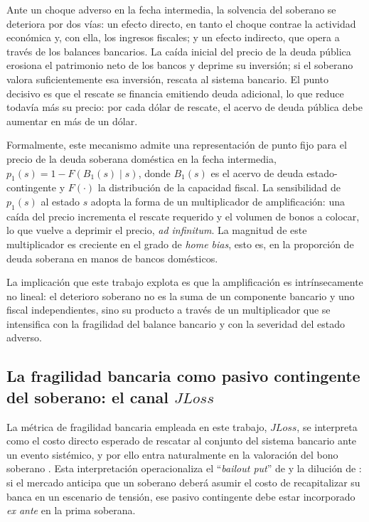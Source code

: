 Ante un choque adverso en la fecha intermedia, la solvencia del soberano se deteriora por dos vías: un efecto directo, en tanto el choque contrae la actividad económica y, con ella, los ingresos fiscales; y un efecto indirecto, que opera a través de los balances bancarios. La caída inicial del precio de la deuda pública erosiona el patrimonio neto de los bancos y deprime su inversión; si el soberano valora suficientemente esa inversión, rescata al sistema bancario. El punto decisivo es que el rescate se financia emitiendo deuda adicional, lo que reduce todavía más su precio: por cada dólar de rescate, el acervo de deuda pública debe aumentar en más de un dólar.

Formalmente, este mecanismo admite una representación de punto fijo para el precio de la deuda soberana doméstica en la fecha intermedia, $p_1(s) = 1 - F\!\left(B_1(s)\mid s\right)$, donde $B_1(s)$ es el acervo de deuda estado-contingente y $F(\cdot)$ la distribución de la capacidad fiscal. La sensibilidad de $p_1(s)$ al estado $s$ adopta la forma de un multiplicador de amplificación: una caída del precio incrementa el rescate requerido y el volumen de bonos a colocar, lo que vuelve a deprimir el precio, \textit{ad infinitum}. La magnitud de este multiplicador es creciente en el grado de \textit{home bias}, esto es, en la proporción de deuda soberana en manos de bancos domésticos.

La implicación que este trabajo explota es que la amplificación es intrínsecamente no lineal: el deterioro soberano no es la suma de un componente bancario y uno fiscal independientes, sino su producto a través de un multiplicador que se intensifica con la fragilidad del balance bancario y con la severidad del estado adverso.

\subsection{La fragilidad bancaria como pasivo contingente del soberano: el canal \texorpdfstring{$JLoss$}{JLoss}}

La métrica de fragilidad bancaria empleada en este trabajo, $JLoss$, se interpreta como el costo directo esperado de rescatar al conjunto del sistema bancario ante un evento sistémico, y por ello entra naturalmente en la valoración del bono soberano \citep{Chari2024b}. Esta interpretación operacionaliza el ``\textit{bailout put}'' de \citet{FarhiTirole2018b} y la dilución de \citet{AcharyaDrechslerSchnabl2014b}: si el mercado anticipa que un soberano deberá asumir el costo de recapitalizar su banca en un escenario de tensión, ese pasivo contingente debe estar incorporado \textit{ex ante} en la prima soberana.

